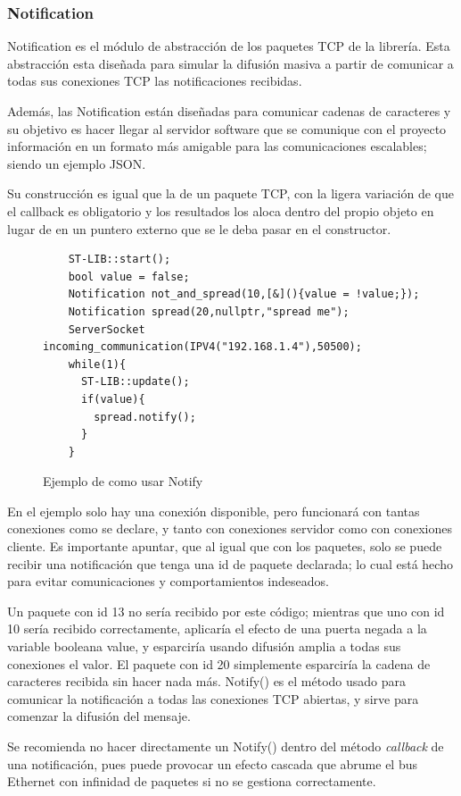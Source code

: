 \documentclass{report}
\begin{document}
\subsubsection{Notification}
Notification es el módulo de abstracción de los paquetes TCP de la librería. Esta abstracción esta diseñada para simular la difusión masiva a partir de comunicar a todas sus conexiones TCP las notificaciones recibidas. \par
Además, las Notification están diseñadas para comunicar cadenas de caracteres y su objetivo es hacer llegar al servidor software que se comunique con el proyecto información en un formato más amigable para las comunicaciones escalables; siendo un ejemplo JSON.
 \par \vspace{0.3cm}
Su construcción es igual que la de un paquete TCP, con la ligera variación de que el callback es obligatorio y los resultados los aloca dentro del propio objeto en lugar de en un puntero externo que se le deba pasar en el constructor. 
\begin{figure}[h]
  \begin{lstlisting}
    ST-LIB::start();
    bool value = false;
    Notification not_and_spread(10,[&](){value = !value;});
    Notification spread(20,nullptr,"spread me");
    ServerSocket incoming_communication(IPV4("192.168.1.4"),50500);
    while(1){
      ST-LIB::update();
      if(value){
        spread.notify();
      }
    }
  \end{lstlisting}
  \caption{Ejemplo de como usar Notify}
  \label{NotifyCode}
\end{figure}
\par \vspace{0.3cm}
En el ejemplo solo hay una conexión disponible, pero funcionará con tantas conexiones como se declare, y tanto con conexiones servidor como con conexiones cliente. Es importante apuntar, que al igual que con los paquetes, solo se puede recibir una notificación que tenga una id de paquete declarada; lo cual está hecho para evitar comunicaciones y comportamientos indeseados. \par 
Un paquete con id 13 no sería recibido por este código; mientras que uno con id 10 sería recibido correctamente, aplicaría el efecto de una puerta negada a la variable booleana value, y esparciría usando difusión amplia a todas sus conexiones el valor. El paquete con id 20 simplemente esparciría la cadena de caracteres recibida sin hacer nada más. Notify() es el método usado para comunicar la notificación a todas las conexiones TCP abiertas, y sirve para comenzar la difusión del mensaje. \par \vspace{0.3cm}
Se recomienda no hacer directamente un Notify() dentro del método \textit{callback} de una notificación, pues puede provocar un efecto cascada que abrume el bus Ethernet con infinidad de paquetes si no se gestiona correctamente.  
\end{document}
